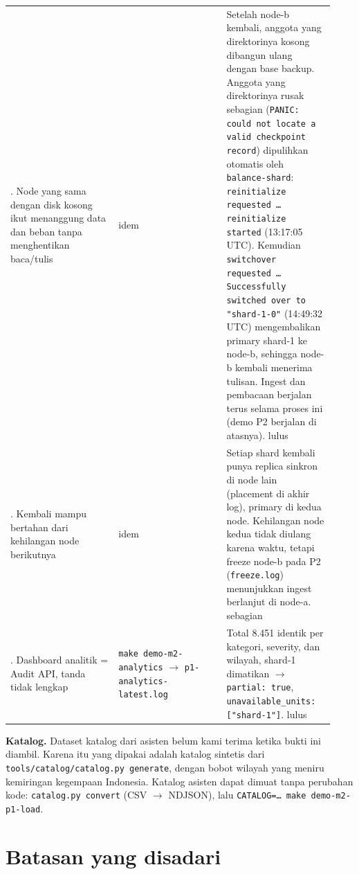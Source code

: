 {\begin{longtable}{@{}>{\raggedright\arraybackslash}p{0.311\linewidth}>{\raggedright\arraybackslash}p{0.311\linewidth}>{\raggedright\arraybackslash}p{0.311\linewidth}@{}}
5. Node yang sama dengan disk kosong ikut menanggung data dan beban tanpa menghentikan baca/tulis & idem & Setelah node-b kembali, anggota yang direktorinya kosong dibangun ulang dengan base backup. Anggota yang direktorinya rusak sebagian (\texttt{PANIC: could not locate a valid checkpoint record}) dipulihkan otomatis oleh \texttt{balance-\allowbreak{}shard}: \texttt{reinitialize requested \ldots{} reinitialize started} (13:17:05 UTC). Kemudian \texttt{switchover requested \ldots{} Successfully switched over to "shard-\allowbreak{}1-\allowbreak{}0"} (14:49:32 UTC) mengembalikan primary shard-1 ke node-b, sehingga node-b kembali menerima tulisan. Ingest dan pembacaan berjalan terus selama proses ini (demo P2 berjalan di atasnya). lulus \\
6. Kembali mampu bertahan dari kehilangan node berikutnya & idem & Setiap shard kembali punya replica sinkron di node lain (placement di akhir log), primary di kedua node. Kehilangan node kedua tidak diulang karena waktu, tetapi freeze node-b pada P2 (\texttt{freeze.\allowbreak{}log}) menunjukkan ingest berlanjut di node-a. sebagian \\
7. Dashboard analitik = Audit API, tanda tidak lengkap & \texttt{make demo-\allowbreak{}m2-\allowbreak{}analytics} $\rightarrow$ \texttt{p1-\allowbreak{}analytics-\allowbreak{}latest.\allowbreak{}log} & Total 8.451 identik per kategori, severity, dan wilayah, shard-1 dimatikan $\rightarrow$ \texttt{partial: true}, \texttt{unavailable\_\allowbreak{}units: ["shard-\allowbreak{}1"]}. lulus \\
\bottomrule
\end{longtable}
}

\textbf{Katalog.} Dataset katalog dari asisten belum kami terima ketika bukti ini diambil. Karena itu yang dipakai adalah katalog sintetis dari \texttt{tools/\allowbreak{}catalog/\allowbreak{}catalog.\allowbreak{}py generate}, dengan bobot wilayah yang meniru kemiringan kegempaan Indonesia. Katalog asisten dapat dimuat tanpa perubahan kode: \texttt{catalog.\allowbreak{}py convert} (CSV $\rightarrow$ NDJSON), lalu \texttt{CATALOG=\allowbreak{}\ldots{} make demo-\allowbreak{}m2-\allowbreak{}p1-\allowbreak{}load}.


\section{Batasan yang disadari}

